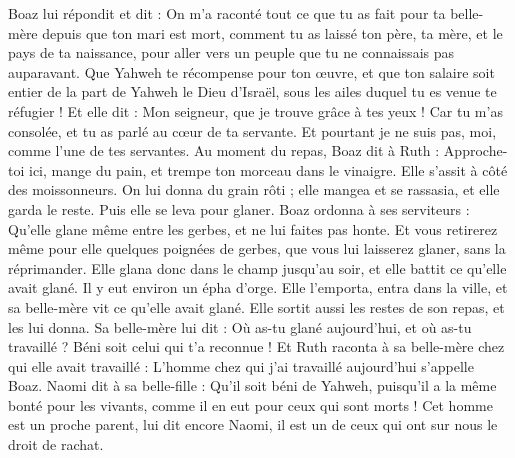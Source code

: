 \begin{multicols}{2}
Boaz lui répondit et dit : On m'a raconté tout ce que tu as fait pour ta belle-mère depuis que ton mari est mort, comment tu as laissé ton père, ta mère, et le pays de ta naissance, pour aller vers un peuple que tu ne connaissais pas auparavant.
Que Yahweh te récompense pour ton œuvre, et que ton salaire soit entier de la part de Yahweh le Dieu d'Israël, sous les ailes duquel tu es venue te réfugier !
Et elle dit : Mon seigneur, que je trouve grâce à tes yeux ! Car tu m'as consolée, et tu as parlé au cœur de ta servante. Et pourtant je ne suis pas, moi, comme l'une de tes servantes.
Au moment du repas, Boaz dit à Ruth : Approche-toi ici, mange du pain, et trempe ton morceau dans le vinaigre. Elle s'assit à côté des moissonneurs. On lui donna du grain rôti ; elle mangea et se rassasia, et elle garda le reste.
Puis elle se leva pour glaner. Boaz ordonna à ses serviteurs : Qu'elle glane même entre les gerbes, et ne lui faites pas honte.
Et vous retirerez même pour elle quelques poignées de gerbes, que vous lui laisserez glaner, sans la réprimander.
Elle glana donc dans le champ jusqu'au soir, et elle battit ce qu'elle avait glané. Il y eut environ un épha d'orge.
Elle l'emporta, entra dans la ville, et sa belle-mère vit ce qu'elle avait glané. Elle sortit aussi les restes de son repas, et les lui donna.
Sa belle-mère lui dit : Où as-tu glané aujourd'hui, et où as-tu travaillé ? Béni soit celui qui t'a reconnue ! Et Ruth raconta à sa belle-mère chez qui elle avait travaillé : L'homme chez qui j'ai travaillé aujourd'hui s’appelle Boaz.
Naomi dit à sa belle-fille : Qu'il soit béni de Yahweh, puisqu'il a la même bonté pour les vivants, comme il en eut pour ceux qui sont morts ! Cet homme est un proche parent, lui dit encore Naomi, il est un de ceux qui ont sur nous le droit de rachat.

\end{multicols}

